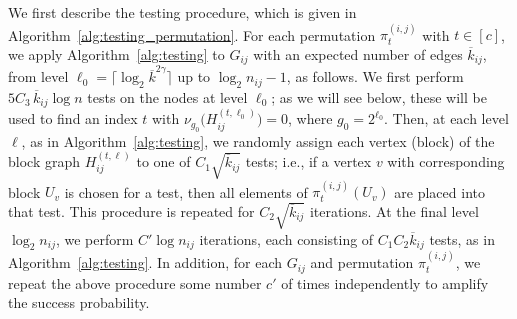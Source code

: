 \documentclass[journal]{IEEEtran}
\theoremstyle{definition}
\theoremstyle{definition}
\newcommand{\PV}{\nu}
\newcommand{\kb}{\overline{k}}
\begin{document}
We first describe the testing procedure, which is given in Algorithm~\ref{alg:testing_permutation}.  For each permutation \(\pi_t^{(i,j)}\) with \(t\in[c]\), we apply Algorithm~\ref{alg:testing} to \(G_{ij}\) with an expected number of edges \(\kb_{ij}\), from level \(\ell_0=\lceil \log_2 \kb^{2\gamma}\rceil\) up to \(\log_2 n_{ij}-1\), as follows.
We first perform $5C_3\,\kb_{ij}\log n$ tests on the nodes at level $\ell_0$; as we will see below, these will be used to find an index $t$ with $\PV_{g_0} \big(H_{ij}^{(t,\ell_0)}\big)=0$, where $g_0=2^{\ell_0}$.
Then, at each level $\ell$, as in Algorithm~\ref{alg:testing}, we randomly assign each vertex (block) of the block graph $H_{ij}^{(t,\ell)}$ to one of $C_1 \sqrt{\kb_{ij}}$ tests; i.e., if a vertex $v$ with corresponding block $U_v$ is chosen for a test, then all elements of $\pi_t^{(i,j)}(U_v)$ are placed into that test. 
This procedure is repeated for $C_2 \sqrt{\kb_{ij}}$ iterations. 
At the final level $\log_2 n_{ij}$, we perform $C' \log n_{ij}$ iterations, each consisting of $C_1 C_2 \kb_{ij}$ tests, as in Algorithm~\ref{alg:testing}. In addition, for each $G_{ij}$ and permutation $\pi_t^{(i,j)}$, we repeat the above procedure some number $c'$ of times independently to amplify the success probability. 
\end{document}
